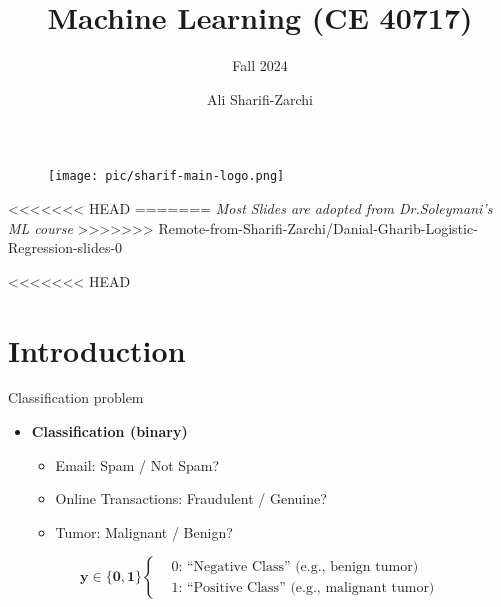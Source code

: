 \documentclass[serif, aspectratio=169]{beamer}
\author{Ali Sharifi-Zarchi}
\title{Machine Learning (CE 40717)}
\subtitle{Fall 2024}
\institute{
    CE Department \\
    Sharif University of Technology
}
\begin{document}
\begin{frame}
    \titlepage
    \vspace*{-0.6cm}
    \begin{figure}[htpb]
        \begin{center}
            \texttt{[image: pic/sharif-main-logo.png]}
        \end{center}
    \end{figure}
    \vfill %
    \vspace{-0.35cm}
<<<<<<< HEAD
=======
    \centering\textit{\tiny Most Slides are adopted from Dr.Soleymani's ML course}
>>>>>>> Remote-from-Sharifi-Zarchi/Danial-Gharib-Logistic-Regression-slides-0
\end{frame}

\begin{frame}    
\tableofcontents[sectionstyle=show,
subsectionstyle=show/shaded/hide,
subsubsectionstyle=show/shaded/hide]
\end{frame}

<<<<<<< HEAD

\section{Introduction}

\begin{frame}{Classification problem}
    \begin{itemize}
        \item \textbf{Classification (binary)}
        \begin{itemize}
            \item Email: Spam / Not Spam?
            \item Online Transactions: Fraudulent / Genuine?
            \item Tumor: Malignant / Benign?
        \end{itemize}
    \end{itemize}
    
    
    \[
               \mathbf{y \in \{0, 1\} } \begin{cases}
                    & \text{0: ``Negative Class'' (e.g., benign tumor)} \\
                     & \text{1: ``Positive Class'' (e.g., malignant tumor)}
                \end{cases}
            \]
\end{frame}
\end{document}
